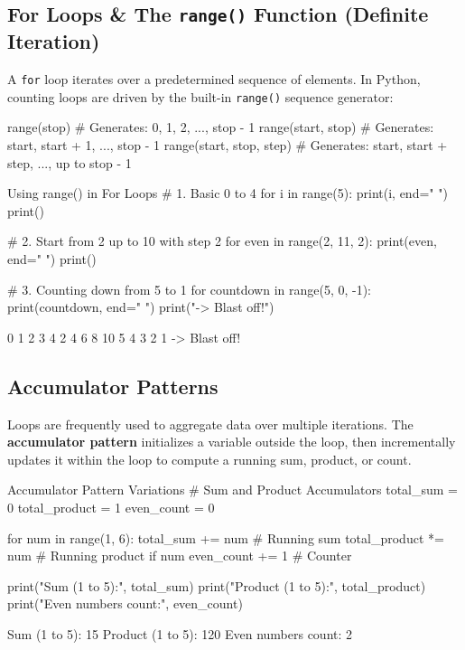 \subsection{For Loops \& The \texttt{range()} Function (Definite Iteration)}

A \texttt{for} loop iterates over a predetermined sequence of elements. In Python, counting loops are driven by the built-in \texttt{range()} sequence generator:

\begin{syntaxbox}
range(stop)                \# Generates: 0, 1, 2, ..., stop - 1
range(start, stop)         \# Generates: start, start + 1, ..., stop - 1
range(start, stop, step)   \# Generates: start, start + step, ..., up to stop - 1
\end{syntaxbox}

\begin{pythoncode}{Using range() in For Loops}
# 1. Basic 0 to 4
for i in range(5):
    print(i, end=" ")
print()

# 2. Start from 2 up to 10 with step 2
for even in range(2, 11, 2):
    print(even, end=" ")
print()

# 3. Counting down from 5 to 1
for countdown in range(5, 0, -1):
    print(countdown, end=" ")
print("-> Blast off!")
\end{pythoncode}

\begin{outputbox}
0 1 2 3 4 
2 4 6 8 10 
5 4 3 2 1 -> Blast off!
\end{outputbox}

\subsection{Accumulator Patterns}

Loops are frequently used to aggregate data over multiple iterations. The \textbf{accumulator pattern} initializes a variable outside the loop, then incrementally updates it within the loop to compute a running sum, product, or count.

\begin{pythoncode}{Accumulator Pattern Variations}
# Sum and Product Accumulators
total_sum = 0
total_product = 1
even_count = 0

for num in range(1, 6):
    total_sum += num         # Running sum
    total_product *= num     # Running product
    if num %
        even_count += 1      # Counter

print("Sum (1 to 5):", total_sum)
print("Product (1 to 5):", total_product)
print("Even numbers count:", even_count)
\end{pythoncode}
\begin{outputbox}
Sum (1 to 5): 15
Product (1 to 5): 120
Even numbers count: 2
\end{outputbox}

